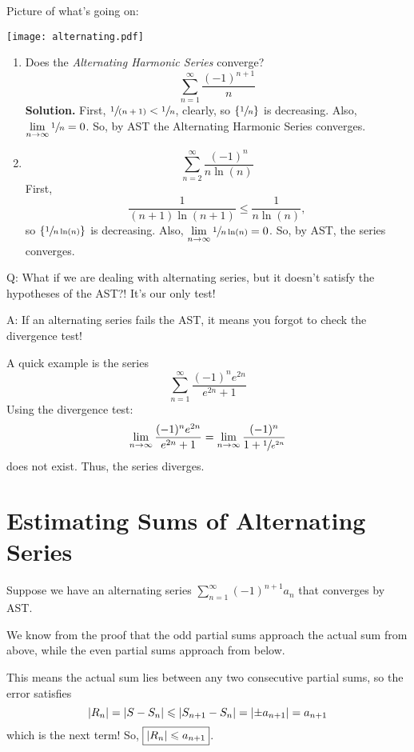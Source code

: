 Picture of what's going on:
\begin{center}
    \texttt{[image: alternating.pdf]}
\end{center}

\begin{Example}{}{}
    \begin{enumerate}
        \item Does the \emph{Alternating Harmonic Series}
              converge? \[ \sum\limits_{n=1}^{\infty} \frac{(-1)^{n+1}}{n} \]
              \textbf{Solution.} First, $ \sfrac{1}{(n+1)}<\sfrac{1}{n} $, clearly,
              so $ \left\{ \sfrac{1}{n}\right\} $ is decreasing. Also,
              $ \lim\limits_{{n} \to {\infty}} \sfrac{1}{n}=0 $. So, by AST
              the Alternating Harmonic Series converges.
        \item \[ \sum\limits_{n=2}^{\infty} \frac{(-1)^n}{n\ln(n)}  \]
              First,
              \[ \frac{1}{(n+1)\ln(n+1)}\leqslant \frac{1}{n\ln(n)}, \]
              so $ \left\{ \sfrac{1}{n\ln(n)}\right\} $ is decreasing. Also,
              $ \lim\limits_{{n} \to {\infty}} \sfrac{1}{n\ln(n)}=0 $. So, by AST,
              the series converges.
    \end{enumerate}
\end{Example}
Q\@: What if we are dealing with alternating series, but it doesn't satisfy
the hypotheses of the AST?! It's our only test!

A\@: If an alternating series fails the AST, it means you forgot to check the divergence test!

A quick example is the series
\[ \sum\limits_{n=1}^{\infty} \frac{(-1)^n e^{2n}}{e^{2n}+1} \]
Using the divergence test:
\[ \lim\limits_{{n} \to {\infty}} \frac{(-1)^n e^{2n}}{e^{2n}+1}=
    \lim\limits_{{n} \to {\infty}} \frac{(-1)^n}{1+\sfrac{1}{e^{2n}}} \]
does not exist. Thus, the series diverges.

\section*{Estimating Sums of Alternating Series}
Suppose we have an alternating series $ \sum\limits_{n=1}^{\infty} (-1)^{n+1}a_n $
that converges by AST\@.

We know from the proof that the odd partial sums approach the actual sum from above,
while the even partial sums approach from below.

This means the actual sum lies between any two consecutive partial sums,
so the error satisfies
\[ \abs*{R_n}=\abs{S-S_n}\leqslant \abs*{S_{n+1}-S_n}=\abs*{\pm a_{n+1}}=
    a_{n+1} \]
which is the next term! So, $ \boxed{\abs*{R_n}\leqslant a_{n+1}} $.

